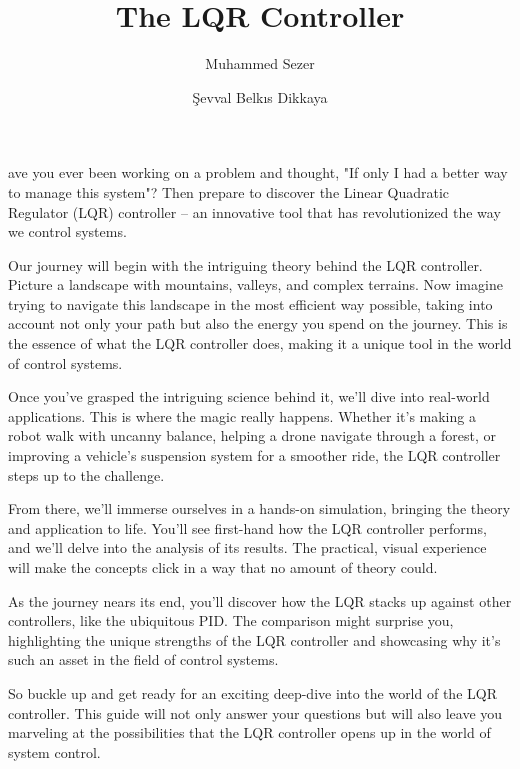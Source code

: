 \documentclass[10pt,twocolumn,twoside,lineno]{pnas-new}
\title{The LQR Controller}
\author[a,b,1]{Muhammed Sezer}
\author[a,b,2]{Şevval Belkıs Dikkaya}
\affil[a]{Middle East Technical University}
\affil[b]{Orion Robotics Ltd.}
\begin{document}
\maketitle
\thispagestyle{firststyle}

ave you ever been working on a problem and thought, "If only I had a better way to manage this system"? Then prepare to discover the Linear Quadratic Regulator (LQR) controller – an innovative tool that has revolutionized the way we control systems.

Our journey will begin with the intriguing theory behind the LQR controller. Picture a landscape with mountains, valleys, and complex terrains. Now imagine trying to navigate this landscape in the most efficient way possible, taking into account not only your path but also the energy you spend on the journey. This is the essence of what the LQR controller does, making it a unique tool in the world of control systems.

Once you've grasped the intriguing science behind it, we'll dive into real-world applications. This is where the magic really happens. Whether it's making a robot walk with uncanny balance, helping a drone navigate through a forest, or improving a vehicle's suspension system for a smoother ride, the LQR controller steps up to the challenge.

From there, we'll immerse ourselves in a hands-on simulation, bringing the theory and application to life. You'll see first-hand how the LQR controller performs, and we'll delve into the analysis of its results. The practical, visual experience will make the concepts click in a way that no amount of theory could.

As the journey nears its end, you'll discover how the LQR stacks up against other controllers, like the ubiquitous PID. The comparison might surprise you, highlighting the unique strengths of the LQR controller and showcasing why it's such an asset in the field of control systems.

So buckle up and get ready for an exciting deep-dive into the world of the LQR controller. This guide will not only answer your questions but will also leave you marveling at the possibilities that the LQR controller opens up in the world of system control.
\end{document}

